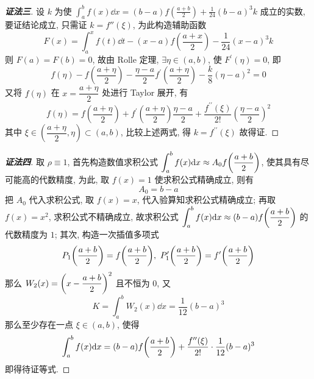 \begin{proof}[{\songti \textbf{证法三}}]
    设 $ k $ 为使 $ \displaystyle \int_{a}^{b} f(x) \dd  x=(b-a) f\left(\frac{a+b}{2}\right)+\frac{1}{24}(b-a)^{3} k $ 成立的实数, 要证结论成立, 只需证 $k=f''(\xi)$, 为此构造辅助函数
    $$ \displaystyle F(x)=\int_{a}^{x} f(t) \dd  t-(x-a) f\left(\frac{a+x}{2}\right)-\frac{1}{24}(x-a)^{3} k $$
    则 $ F(a)=F(b)=0 $, 故由 Rolle 定理, $\exists \eta \in(a, b) $, 使 $ F^{\prime}(\eta)=0 $, 即
    $$f(\eta)-f\left(\frac{a+\eta}{2}\right)-\frac{\eta-a}{2} f^{\prime}\left(\frac{a+\eta}{2}\right)-\frac{k}{8}(\eta-a)^{2}=0 $$
    又将 $ f(\eta) $ 在 $ x=\dfrac{a+\eta}{2} $ 处进行 Taylor 展开, 有
    $$f(\eta)=f\left(\dfrac{a+\eta}{2}\right)+f^{\prime}\left(\frac{a+\eta}{2}\right) \frac{\eta-a}{2}+\frac{f^{\prime \prime}(\xi)}{2 !}\left(\frac{\eta-a}{2}\right)^{2}$$
    其中 $ \xi \in\left(\dfrac{a+\eta}{2}, \eta\right) \subset(a, b) $,
    比较上述两式, 得 $ k=f^{\prime \prime}(\xi) $ 故得证.
\end{proof}
\begin{proof}[{\songti \textbf{证法四}}]
    取 $\rho\equiv1$, 首先构造数值求积公式 $\displaystyle\int_{a}^{b}f(x)\dd x\approx A_0f\qty(\dfrac{a+b}{2})$, 使其具有尽可能高的代数精度,
    为此, 取 $f(x)=1$ 使求积公式精确成立, 则有 $$A_0=b-a$$
    把 $A_0$ 代入求积公式, 取 $f(x)=x$, 代入验算知求积公式精确成立; 再取 $f(x)=x^2$, 求积公式不精确成立,
    故求积公式 $\displaystyle\int_{a}^{b}f(x)\dd x\approx (b-a)f\qty(\dfrac{a+b}{2})$ 的代数精度为 $1$;
    其次, 构造一次插值多项式
    $$P_1\qty(\dfrac{a+b}{2})=f\qty(\dfrac{a+b}{2}),~P'_1\qty(\dfrac{a+b}{2})=f'\qty(\dfrac{a+b}{2})$$
    那么 $W_2(x)=\qty(x-\dfrac{a+b}{2})^2$ 且不恒为 $0$, 又
    $$K=\int_{a}^{b}W_2(x)\dd x=\dfrac{1}{12}(b-a)^3$$
    那么至少存在一点 $\xi\in(a,b)$, 使得 $$\int_{a}^{b}f(x)\dd x=(b-a)f\qty(\dfrac{a+b}{2})+\dfrac{f''(\xi)}{2!}\cdot\dfrac{1}{12}(b-a)^3$$
    即得待证等式.
\end{proof}

